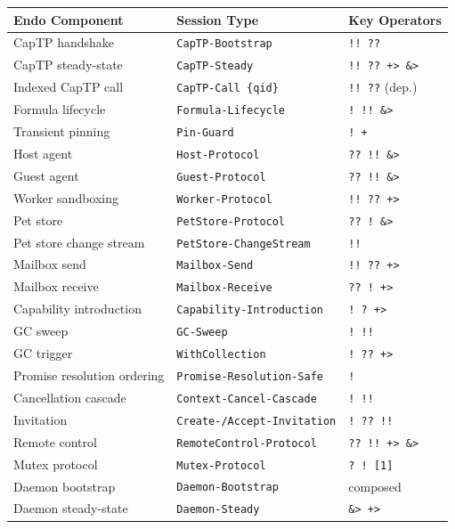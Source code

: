 \documentclass[11pt]{article}
\begin{document}
\begin{center}
\begin{tabular}{lll}
Endo Component & Session Type & Key Operators\\
\hline
CapTP handshake & \texttt{CapTP-Bootstrap} & \texttt{!! ??}\\
CapTP steady-state & \texttt{CapTP-Steady} & \texttt{!! ?? +> \&>}\\
Indexed CapTP call & \texttt{CapTP-Call \{qid\}} & \texttt{!! ??} (dep.)\\
Formula lifecycle & \texttt{Formula-Lifecycle} & \texttt{! !! \&>}\\
Transient pinning & \texttt{Pin-Guard} & \texttt{! +}\\
Host agent & \texttt{Host-Protocol} & \texttt{?? !! \&>}\\
Guest agent & \texttt{Guest-Protocol} & \texttt{?? !! \&>}\\
Worker sandboxing & \texttt{Worker-Protocol} & \texttt{!! ?? +>}\\
Pet store & \texttt{PetStore-Protocol} & \texttt{?? ! \&>}\\
Pet store change stream & \texttt{PetStore-ChangeStream} & \texttt{!!}\\
Mailbox send & \texttt{Mailbox-Send} & \texttt{!! ?? +>}\\
Mailbox receive & \texttt{Mailbox-Receive} & \texttt{?? ! +>}\\
Capability introduction & \texttt{Capability-Introduction} & \texttt{! ? +>}\\
GC sweep & \texttt{GC-Sweep} & \texttt{! !!}\\
GC trigger & \texttt{WithCollection} & \texttt{! ?? +>}\\
Promise resolution ordering & \texttt{Promise-Resolution-Safe} & \texttt{!}\\
Cancellation cascade & \texttt{Context-Cancel-Cascade} & \texttt{! !!}\\
Invitation & \texttt{Create-/Accept-Invitation} & \texttt{! ?? !!}\\
Remote control & \texttt{RemoteControl-Protocol} & \texttt{?? !! +> \&>}\\
Mutex protocol & \texttt{Mutex-Protocol} & \texttt{? ! [1]}\\
Daemon bootstrap & \texttt{Daemon-Bootstrap} & composed\\
Daemon steady-state & \texttt{Daemon-Steady} & \texttt{\&> +>}\\
\end{tabular}
\end{center}
\end{document}
